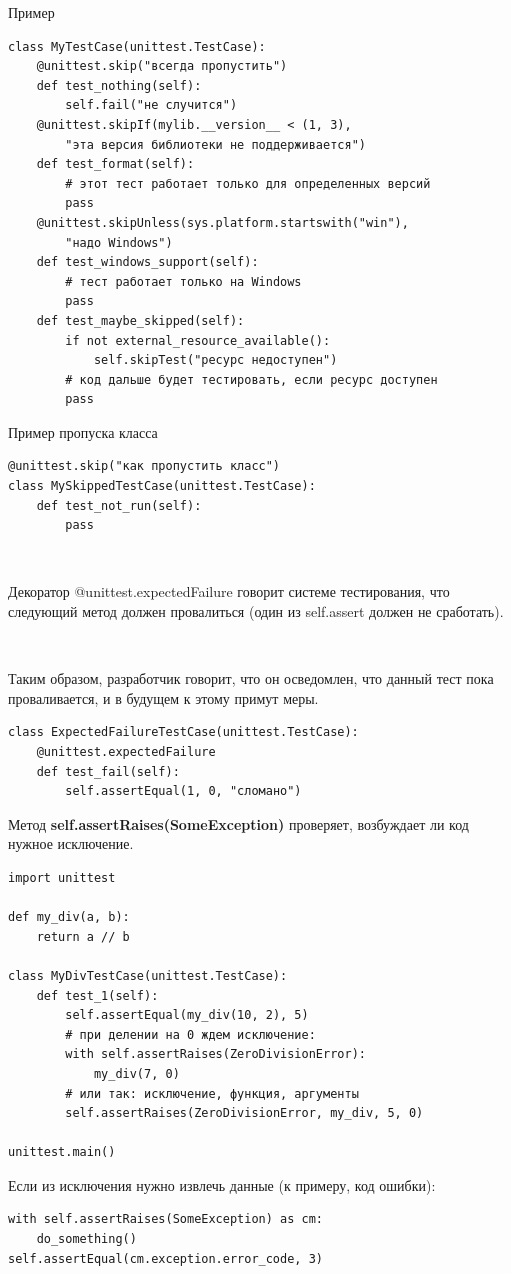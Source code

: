 \documentclass[xcolor=table]{beamer}
\begin{document}
\begin{frame}[t, fragile]{Пример}
	\linespread{0.8}
	\begin{verbatim}
class MyTestCase(unittest.TestCase):
    @unittest.skip("всегда пропустить")
    def test_nothing(self):
        self.fail("не случится")
    @unittest.skipIf(mylib.__version__ < (1, 3),
        "эта версия библиотеки не поддерживается")
    def test_format(self):
        # этот тест работает только для определенных версий 
        pass
    @unittest.skipUnless(sys.platform.startswith("win"), 
        "надо Windows")
    def test_windows_support(self):
        # тест работает только на Windows
        pass
    def test_maybe_skipped(self):
        if not external_resource_available():
            self.skipTest("ресурс недоступен")
        # код дальше будет тестировать, если ресурс доступен
        pass
	\end{verbatim}
\end{frame}

\begin{frame}[t, fragile]{Пример пропуска класса}
	\linespread{1.0}
	\begin{verbatim}
@unittest.skip("как пропустить класс")
class MySkippedTestCase(unittest.TestCase):
    def test_not_run(self):
        pass
	\end{verbatim}
	
	~
	
	Декоратор @unittest.expectedFailure говорит системе тестирования, что следующий метод 	должен провалиться (один из self.assert должен не сработать). 

	~	
	
	Таким образом, разработчик говорит, что он осведомлен, что данный тест пока проваливается, и в будущем к этому примут меры.
	\begin{verbatim}
class ExpectedFailureTestCase(unittest.TestCase):
    @unittest.expectedFailure
    def test_fail(self):
        self.assertEqual(1, 0, "сломано")
	\end{verbatim}
\end{frame}

\begin{frame}[t, fragile]
	\linespread{0.8}
	Метод \textbf{self.assertRaises(SomeException)} проверяет, возбуждает ли код нужное исключение. 
	\begin{verbatim}
import unittest

def my_div(a, b):
    return a // b
    
class MyDivTestCase(unittest.TestCase):
    def test_1(self):
        self.assertEqual(my_div(10, 2), 5)
        # при делении на 0 ждем исключение:
        with self.assertRaises(ZeroDivisionError):
            my_div(7, 0)
        # или так: исключение, функция, аргументы
        self.assertRaises(ZeroDivisionError, my_div, 5, 0)
        
unittest.main()
	\end{verbatim}
	Если из исключения нужно извлечь данные (к примеру, код ошибки):
	\begin{verbatim}
with self.assertRaises(SomeException) as cm:
    do_something()
self.assertEqual(cm.exception.error_code, 3)
	\end{verbatim}
\end{frame}
\end{document}
